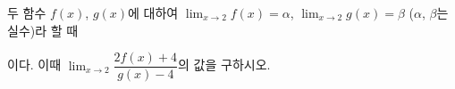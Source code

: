 두 함수 $f(x)$, $g(x)$에 대하여 $\displaystyle\lim_{x\to 2} f(x)=\alpha$, $\displaystyle\lim_{x\to 2} g(x)=\beta$ ($\alpha$, $\beta$는 실수)라 할 때 \par\smallskip{}\par\smallskip\noindent 이다. 이때 $\displaystyle\lim_{x\to 2}\dfrac{2f(x)+4}{g(x)-4}$의 값을 구하시오. \cond{$\alpha>\beta$}
